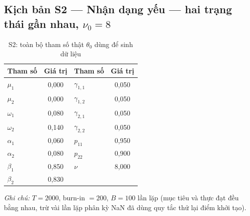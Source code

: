 \documentclass[11pt,a4paper]{article}
\begin{document}
\subsection*{Kịch bản S2 --- Nhận dạng yếu --- hai trạng thái gần nhau, $\nu_0=8$}
\begin{table}[H]\centering\normalsize
\caption{S2: toàn bộ tham số thật $\theta_0$ dùng để sinh dữ liệu}
\begin{tabularx}{\textwidth}{l C  l C}
\toprule
\textbf{Tham số} & \textbf{Giá trị} & \textbf{Tham số} & \textbf{Giá trị} \\
\midrule
$\mu_1$ & 0,000 & $\gamma_{1,1}$ & 0,050 \\
$\mu_2$ & 0,000 & $\gamma_{1,2}$ & 0,050 \\
$\omega_1$ & 0,080 & $\gamma_{2,1}$ & 0,050 \\
$\omega_2$ & 0,140 & $\gamma_{2,2}$ & 0,050 \\
$\alpha_1$ & 0,060 & $p_{11}$ & 0,950 \\
$\alpha_2$ & 0,080 & $p_{22}$ & 0,900 \\
$\beta_1$ & 0,850 & $\nu$ & 8,000 \\
$\beta_2$ & 0,830 &  &  \\
\bottomrule
\end{tabularx}
\vspace{0.2em}\raggedright\scriptsize \emph{Ghi chú:} $T=2000$, burn-in $=200$, $B=100$ lần lặp (mục tiêu và thực đạt đều bằng nhau, trừ vài lần lặp phân kỳ NaN đã dùng quy tắc thử lại điểm khởi tạo).
\end{table}
\end{document}
